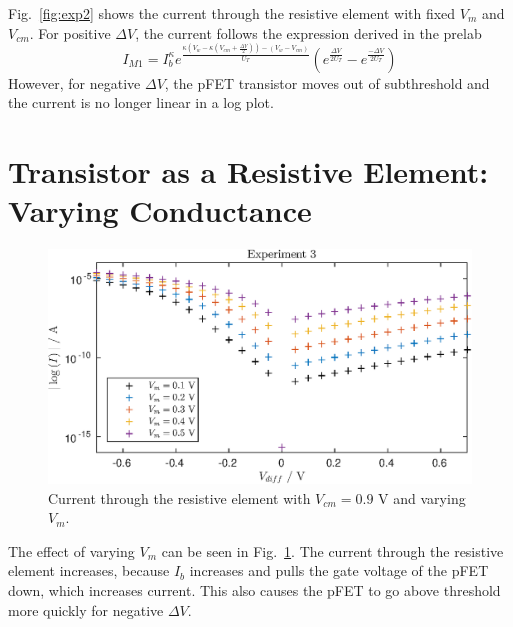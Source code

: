 Fig.~\ref{fig:exp2} shows the current through the resistive element with fixed $V_m$ and $V_{cm}$. For positive \(\Delta V\),
the current follows the expression derived in the prelab
\begin{equation*}
    I_{M1} = I_b^\kappa e^{\frac{\kappa (V_w - \kappa \left(V_{cm}+\frac{\Delta V}{2}\right)) - (V_w - V_{cm})}{U_T}}\left(e^{\frac{\Delta V}{2U_T}}-e^{\frac{-\Delta V}{2U_T}}\right)
\end{equation*}
However, for negative \(\Delta V\), the pFET transistor moves out of subthreshold and the current is no longer linear in a log plot.
\section{Transistor as a Resistive Element: Varying Conductance}
\begin{figure}
    \center
    \includegraphics{exp3.eps}
    \caption{Current through the resistive element with $V_{cm}=0.9$ V and varying $V_m$.}
    \label{fig:exp3}
\end{figure}
The effect of varying $V_m$ can be seen in Fig.~\ref{fig:exp3}. The current through the resistive element increases, because $I_b$ increases
and pulls the gate voltage of the pFET down, which increases current. This also causes the pFET to go above threshold more quickly for 
negative \(\Delta V\).
